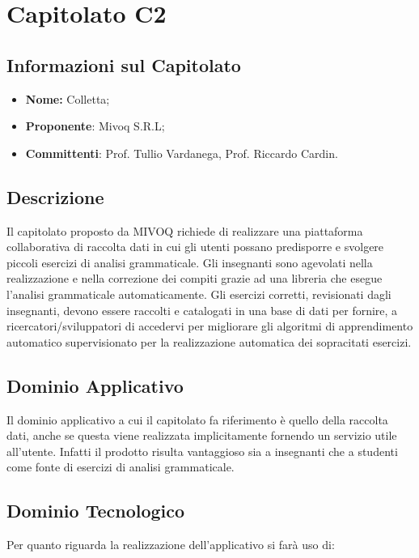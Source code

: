 \section{Capitolato C2}
\subsection{Informazioni sul Capitolato}
\begin{itemize}
	\item \textbf{Nome:} Colletta;
	\item \textbf{Proponente}: Mivoq S.R.L;
	\item \textbf{Committenti}: Prof. Tullio Vardanega, Prof. Riccardo Cardin.
\end{itemize}

\subsection{Descrizione}
Il capitolato proposto da MIVOQ richiede di  realizzare una piattaforma collaborativa di raccolta dati in cui gli utenti possano predisporre e svolgere piccoli esercizi di analisi grammaticale. Gli insegnanti sono agevolati nella realizzazione e nella correzione dei compiti grazie ad una libreria che esegue l’analisi grammaticale automaticamente.
Gli esercizi corretti, revisionati dagli insegnanti, devono essere raccolti e catalogati in una base di dati per fornire, a ricercatori/sviluppatori di accedervi per migliorare gli algoritmi di apprendimento automatico supervisionato per la realizzazione automatica dei sopracitati esercizi.


\subsection{Dominio Applicativo}
Il dominio applicativo a cui il capitolato fa riferimento è quello della raccolta dati, anche se questa viene realizzata implicitamente fornendo un servizio utile all’utente. Infatti il prodotto risulta vantaggioso sia a insegnanti che a studenti come fonte di esercizi di analisi grammaticale.

\subsection{Dominio Tecnologico}
Per quanto riguarda la realizzazione dell’applicativo si farà uso di:


